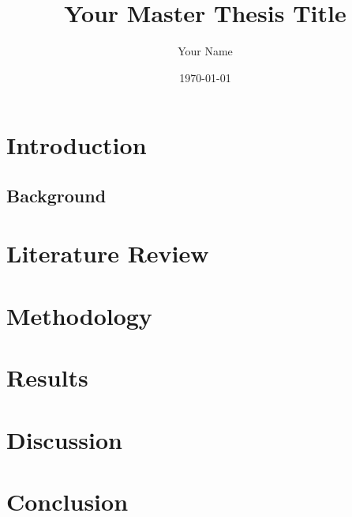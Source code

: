 \documentclass{report}
\title{Your Master Thesis Title}
\author{Your Name}
\date{\today}
\begin{document}
\maketitle

\begin{abstract}
\end{abstract}

\tableofcontents

\chapter{Introduction}
\section{Background}

\chapter{Literature Review}

\chapter{Methodology}

\chapter{Results}

\chapter{Discussion}

\chapter{Conclusion}

\begin{thebibliography}{}
\end{thebibliography}
\end{document}
